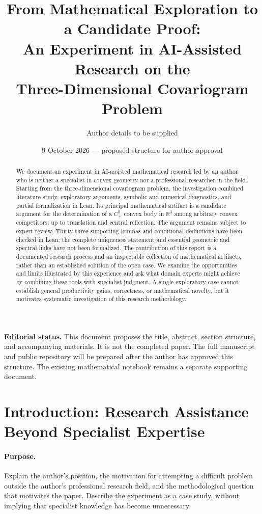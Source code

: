 \documentclass[11pt,a4paper]{article}
\title{From Mathematical Exploration to a Candidate Proof:\\
An Experiment in AI-Assisted Research on the\\
Three-Dimensional Covariogram Problem}
\author{Author details to be supplied}
\date{9 October 2026 --- proposed structure for author approval}
\begin{document}
\maketitle

\noindent\textbf{Editorial status.}
This document proposes the title, abstract, section structure, and accompanying
materials. It is not the completed paper. The full manuscript and public
repository will be prepared after the author has approved this structure.
The existing mathematical notebook remains a separate supporting document.

\begin{abstract}
We document an experiment in AI-assisted mathematical research led by an
author who is neither a specialist in convex geometry nor a professional
researcher in the field. Starting from the three-dimensional covariogram
problem, the investigation combined literature study, exploratory arguments,
symbolic and numerical diagnostics, and partial formalization in Lean. Its
principal mathematical artifact is a candidate argument for the determination
of a $C^9_+$ convex body in $\mathbb R^3$ among arbitrary convex competitors,
up to translation and central reflection. The argument remains subject to
expert review. Thirty-three supporting lemmas and conditional deductions have
been checked in Lean; the complete uniqueness statement and essential
geometric and spectral links have not been formalized. The contribution of
this report is a documented research process and an inspectable collection
of mathematical artifacts, rather than an established solution of the open
case. We examine the opportunities and limits illustrated by this experience
and ask what domain experts might achieve by combining these tools with
specialist judgment. A single exploratory case cannot establish general
productivity gains, correctness, or mathematical novelty, but it motivates
systematic investigation of this research methodology.
\end{abstract}

\section{Introduction: Research Assistance Beyond Specialist Expertise}
\paragraph{Purpose.}
Explain the author's position, the motivation for attempting a difficult
problem outside the author's professional research field, and the methodological
question that motivates the paper. Describe the experiment as a case study,
without implying that specialist knowledge has become unnecessary.
\end{document}
